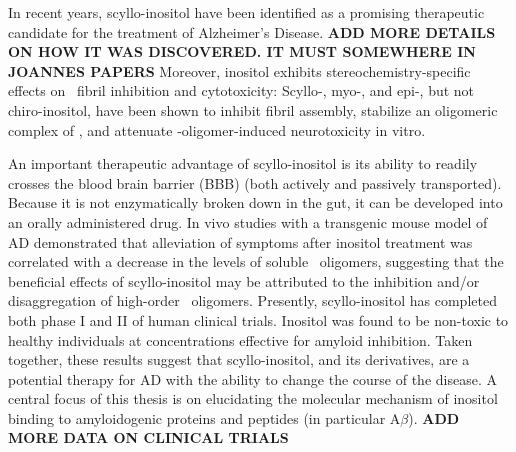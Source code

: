 In recent years, scyllo-inositol have been identified as a promising therapeutic candidate for the treatment of Alzheimer's Disease. \textbf{ADD MORE DETAILS ON HOW IT WAS DISCOVERED.  IT MUST SOMEWHERE IN JOANNES PAPERS} 
Moreover, inositol exhibits stereochemistry-specific effects on \abeta\  fibril inhibition and cytotoxicity: \cite{McLaurin:2000bq} Scyllo-, myo-, and epi-, but not chiro-inositol, have been shown to inhibit  fibril assembly, stabilize an oligomeric complex of , and attenuate \abeta-oligomer-induced neurotoxicity in vitro. 

An important therapeutic advantage of scyllo-inositol is its ability to readily crosses the bloodbrain barrier (BBB) (both actively and passively transported). Because it is not enzymatically broken down in the gut, it can be developed into an orally administered drug. %
In vivo studies with a transgenic mouse model of AD demonstrated that alleviation of symptoms after inositol treatment was correlated with a decrease in the levels of soluble \abeta\ oligomers, suggesting that the beneficial effects of scyllo-inositol may be attributed to the inhibition and/or disaggregation of high-order \abeta\ oligomers.\cite{McLaurin:2006eb}
Presently, scyllo-inositol has completed both phase I and II of human clinical trials.  Inositol was found to be non-toxic to healthy individuals at concentrations effective for amyloid inhibition. Taken together, these results suggest that scyllo-inositol, and its derivatives, are a potential therapy for AD with the ability to change the course of the disease.\cite{Nitz:2008jl,Sun:2008ko}  A central focus of this thesis is on elucidating the molecular mechanism of inositol binding to amyloidogenic proteins and peptides (in particular A$\beta$).
\textbf{ADD MORE DATA ON CLINICAL TRIALS}

